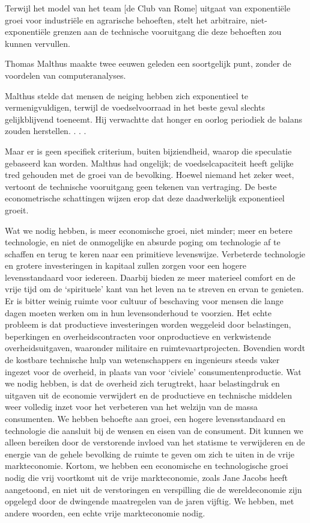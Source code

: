 \documentclass[
  a5paper,
  smalldemyvopaper,10pt,twoside,onecolumn,openright,extrafontsizes,hidelinks]{memoir}
\renewenvironment{quote}%
               {\list{}{\rightmargin=.6cm\leftmargin=.6cm}%
                \itshape \item[]}%
               {\endlist}
\begin{document}
\begin{quote}
Terwijl het model van het team {[}de Club van Rome{]} uitgaat van
exponentiële groei voor industriële en agrarische behoeften, stelt het
arbitraire, niet-exponentiële grenzen aan de technische vooruitgang die
deze behoeften zou kunnen vervullen.

Thomas Malthus maakte twee eeuwen geleden een soortgelijk punt, zonder
de voordelen van computeranalyses.

Malthus stelde dat mensen de neiging hebben zich exponentieel te
vermenigvuldigen, terwijl de voedselvoorraad in het beste geval slechts
gelijkblijvend toeneemt. Hij verwachtte dat honger en oorlog periodiek
de balans zouden herstellen. . . .

Maar er is geen specifiek criterium, buiten bijziendheid, waarop die
speculatie gebaseerd kan worden. Malthus had ongelijk; de
voedselcapaciteit heeft gelijke tred gehouden met de groei van de
bevolking. Hoewel niemand het zeker weet, vertoont de technische
vooruitgang geen tekenen van vertraging. De beste econometrische
schattingen wijzen erop dat deze daadwerkelijk exponentieel groeit.
\end{quote}

Wat we nodig hebben, is meer economische groei, niet minder; meer en
betere technologie, en niet de onmogelijke en absurde poging om
technologie af te schaffen en terug te keren naar een primitieve
levenswijze. Verbeterde technologie en grotere investeringen in kapitaal
zullen zorgen voor een hogere levensstandaard voor iedereen. Daarbij
bieden ze meer materieel comfort en de vrije tijd om de `spirituele'
kant van het leven na te streven en ervan te genieten. Er is bitter
weinig ruimte voor cultuur of beschaving voor mensen die lange dagen
moeten werken om in hun levensonderhoud te voorzien. Het echte probleem
is dat productieve investeringen worden weggeleid door belastingen,
beperkingen en overheidscontracten voor onproductieve en verkwistende
overheidsuitgaven, waaronder militaire en ruimtevaartprojecten.
Bovendien wordt de kostbare technische hulp van wetenschappers en
ingenieurs steeds vaker ingezet voor de overheid, in plaats van voor
`civiele' consumentenproductie. Wat we nodig hebben, is dat de overheid
zich terugtrekt, haar belastingdruk en uitgaven uit de economie
verwijdert en de productieve en technische middelen weer volledig inzet
voor het verbeteren van het welzijn van de massa consumenten. We hebben
behoefte aan groei, een hogere levensstandaard en technologie die
aansluit bij de wensen en eisen van de consument. Dit kunnen we alleen
bereiken door de verstorende invloed van het statisme te verwijderen en
de energie van de gehele bevolking de ruimte te geven om zich te uiten
in de vrije markteconomie. Kortom, we hebben een economische en
technologische groei nodig die vrij voortkomt uit de vrije
markteconomie, zoals Jane Jacobs heeft aangetoond, en niet uit de
verstoringen en verspilling die de wereldeconomie zijn opgelegd door de
dwingende maatregelen van de jaren vijftig. We hebben, met andere
woorden, een echte vrije markteconomie nodig.
\end{document}

